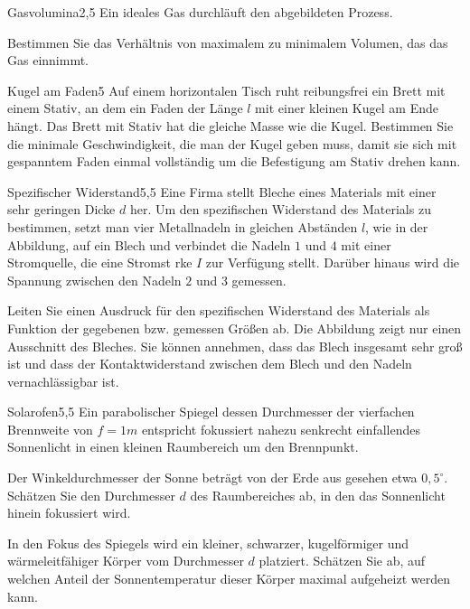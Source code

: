 

\begin{problem}{Gasvolumina}{2,5}
Ein ideales Gas durchläuft den abgebildeten Prozess.


Bestimmen Sie das Verhältnis von maximalem zu minimalem Volumen, das das Gas einnimmt.
 \begin{solution}
  
 \end{solution}
\end{problem}

\begin{problem}{Kugel am Faden}{5}
Auf einem horizontalen Tisch ruht reibungsfrei ein Brett mit einem Stativ, an dem ein Faden der Länge $l$ mit einer kleinen Kugel am Ende hängt.  Das Brett mit Stativ hat die gleiche Masse wie die Kugel.
Bestimmen Sie die minimale Geschwindigkeit, die man der Kugel geben muss, damit sie sich mit gespanntem Faden einmal vollständig um die Befestigung am Stativ drehen kann.
\end{problem}

\begin{problem}{Spezifischer Widerstand}{5,5}
Eine Firma stellt Bleche eines Materials mit einer sehr geringen Dicke $d$ her.  Um den spezifischen Widerstand des Materials zu bestimmen, setzt man vier Metallnadeln in gleichen Abständen $l$, wie in der Abbildung, auf ein Blech und verbindet die Nadeln $1$ und $4$ mit einer Stromquelle, die eine Stromst rke $I$ zur Verfügung stellt.  Darüber hinaus wird die Spannung zwischen den Nadeln $2$ und $3$ gemessen.

Leiten Sie einen Ausdruck für den spezifischen Widerstand des Materials als Funktion der gegebenen bzw. gemessen Größen ab.  Die Abbildung zeigt nur einen Ausschnitt des Bleches.  Sie können annehmen, dass das Blech insgesamt sehr groß ist und dass der Kontaktwiderstand zwischen dem Blech und den Nadeln vernachlässigbar ist.
\end{problem}

\begin{problem}{Solarofen}{5,5}
Ein parabolischer Spiegel dessen Durchmesser der vierfachen Brennweite von $f=1\unit{m}$ entspricht fokussiert nahezu senkrecht einfallendes Sonnenlicht in einen kleinen Raumbereich um den Brennpunkt.

\begin{abcenum}
  \item Der Winkeldurchmesser der Sonne beträgt von der Erde aus gesehen etwa $0,5^{\circ}$.  Schätzen Sie den Durchmesser $d$ des Raumbereiches ab, in den das Sonnenlicht hinein fokussiert wird.
  \item In den Fokus des Spiegels wird ein kleiner, schwarzer, kugelförmiger und wärmeleitfähiger Körper vom Durchmesser $d$ platziert.  Schätzen Sie ab, auf welchen Anteil der Sonnentemperatur dieser Körper maximal aufgeheizt werden kann.
\end{abcenum}
\end{problem}

